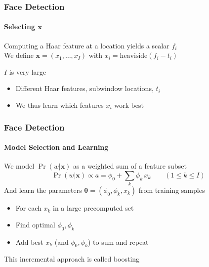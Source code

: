 \documentclass[xetex,professionalfont]{beamer}
\renewcommand{\vec}[1]{\ensuremath{\mathbf{#1}}}
\newcommand{\vx}{\vec{x}}
\newcommand{\bth}{\boldsymbol{\theta}}
\renewcommand\emph[1]{\textcolor{tuwcvl_inf_red}{#1}}
\begin{document}

\begin{frame}
\frametitle{Face Detection}
\framesubtitle{Selecting $\vx$}

Computing a Haar feature at a location yields a scalar $f_i$ \\
We define $\vx=(x_1,\dots,x_I)$ with $x_i=\text{heaviside}(f_i-t_i)$ %

\bigskip
$I$ is very large
\begin{itemize}
    \item Different Haar features, subwindow locations, $t_i$
    \item We thus learn which features $x_i$ work best
\end{itemize}

\end{frame}


\begin{frame}
\frametitle{Face Detection}
\framesubtitle{Model Selection and Learning}

We model $\Pr(w|\vx)$ as a weighted sum of a feature subset
\[
    \Pr(w|\vx) \propto a = \phi_0+\sum_k \phi_k\, x_k \qquad (1\leq k\leq I)
\]
And learn the parameters $\bth=(\phi_0,\phi_k,x_k)$ from training samples
\begin{itemize}
    \item For each $x_k$ in a large precomputed set
    \item Find optimal $\phi_0,\phi_k$
    \item Add best $x_k$ (and $\phi_0,\phi_k$) to sum and repeat
\end{itemize}

\bigskip
This incremental approach is called \emph{boosting}

\end{frame}

\end{document}
